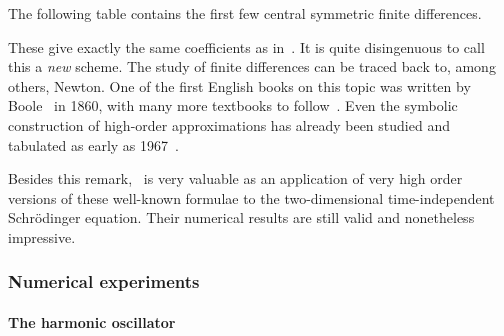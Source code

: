 The following table contains the first few central symmetric finite differences.
\begin{center}
    
\end{center}

These give exactly the same coefficients as in~\cite{wang_new_2009}. It is quite disingenuous to call this a \emph{new} scheme. The study of finite differences can be traced back to, among others, Newton. One of the first English books on this topic was written by Boole~\cite{boole_calculus_1860} in 1860, with many more textbooks to follow~\cite{thomson_calculus_1933,jordan_calculus_1965}. Even the symbolic construction of high-order approximations has already been studied and tabulated as early as 1967~\cite{ballester_construction_1967,keller_symbolic_1978,fornberg_generation_1988}.

Besides this remark,~\cite{wang_new_2009} is very valuable as an application of very high order versions of these well-known formulae to the two-dimensional time-independent Schrödinger equation. Their numerical results are still valid and nonetheless impressive.

\subsubsection{Numerical experiments}\label{sec:c4_fd_numerical}

\paragraph{The harmonic oscillator}

